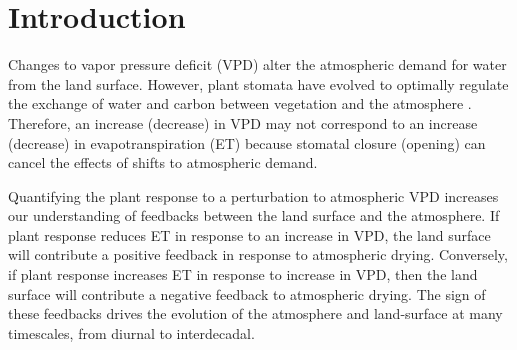 \documentclass[draft,linenumbers]{agujournal}
\begin{document}

%
% 
% 
% 


\section{Introduction}

Changes to vapor pressure deficit (VPD) alter the atmospheric demand for water from the land surface. However, plant stomata have evolved to optimally regulate the exchange of water and carbon between vegetation and the atmosphere \citep{Franks_2017}. Therefore, an increase (decrease) in VPD may not correspond to an increase (decrease) in evapotranspiration (ET) because stomatal closure (opening) can cancel the effects of shifts to atmospheric demand.

Quantifying the plant response to a perturbation to atmospheric VPD increases our understanding of feedbacks between the land surface and the atmosphere. If plant response reduces ET in response to an increase in VPD, the land surface will contribute a positive feedback in response to atmospheric drying. Conversely, if plant response increases ET in response to increase in VPD, then the land surface will contribute a negative feedback to atmospheric drying. The sign of these feedbacks drives the evolution of the atmosphere and land-surface at many timescales, from diurnal to interdecadal. 
\end{document}
